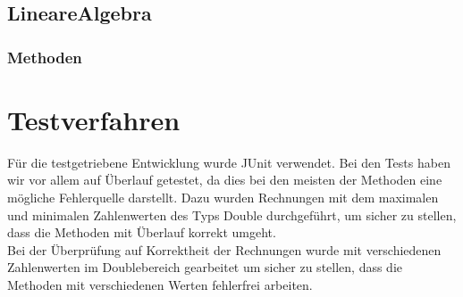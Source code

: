 \documentclass[a4paper,11pt]{scrartcl}
\begin{document}
\subsection{LineareAlgebra}
\subsubsection{Methoden}

\section{Testverfahren}
Für die testgetriebene Entwicklung wurde JUnit verwendet. Bei den Tests haben wir vor allem auf Überlauf getestet, da dies bei den meisten der Methoden eine mögliche Fehlerquelle darstellt. Dazu wurden Rechnungen mit dem maximalen und minimalen Zahlenwerten des Typs Double durchgeführt, um sicher zu stellen, dass die Methoden mit Überlauf korrekt umgeht. 
\\
Bei der Überprüfung auf Korrektheit der Rechnungen wurde mit verschiedenen Zahlenwerten im Doublebereich gearbeitet um sicher zu stellen, dass die Methoden mit verschiedenen Werten fehlerfrei arbeiten. 
\end{document}
